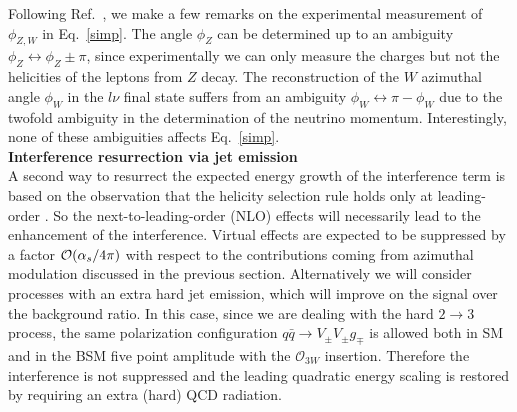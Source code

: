  
 Following Ref.~\cite{Panico:2017frx}, we make a few remarks on the experimental measurement  of $\phi_{Z,W}$ in Eq.~\ref{simp}.
 The angle $\phi_Z$  can be determined up to an ambiguity  $\phi_Z\leftrightarrow \phi_Z \pm \pi$,
 since experimentally we can only measure the charges but not the helicities of the  leptons from $Z$  decay.
 The reconstruction of the $W$  azimuthal  angle $\phi_W$ in the $l\nu$ final state  suffers from an ambiguity  $\phi_W \leftrightarrow \pi-\phi_W$ due to the twofold ambiguity in the determination of the neutrino momentum.
Interestingly, none of these ambiguities  affects  Eq.~\ref{simp}.\\

\noindent
{\bf Interference resurrection via jet emission}\\
A second way to resurrect the expected energy growth of the 
interference term is based on the observation that the helicity 
selection rule holds only at leading-order \cite{Azatov:2017kzw}. 
So the next-to-leading-order (NLO) effects will necessarily lead to the 
enhancement of the interference.
Virtual effects are expected to be suppressed by a factor ${\cal{O}}( 
\alpha_s/4\pi)$ with respect to the contributions coming from 
azimuthal modulation discussed in the previous section.
Alternatively we will consider processes with an extra hard jet emission, which will improve on the  signal over the  background ratio. 
 In this case,  since   we are dealing with the hard
  $2\to 3$ process,
 the same polarization configuration $q\bar{q}\to V_{\pm}V_{\pm}g_{\mp}$ is allowed both in SM and in the BSM five point amplitude with the $\mathcal{O}_{3W}$ insertion. Therefore the interference is not suppressed and the leading quadratic energy scaling is restored by requiring an extra (hard) QCD radiation.\\

